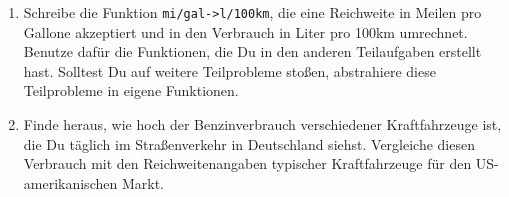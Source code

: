 \begin{aufgabe}
\begin{enumerate}
  \item Schreibe die Funktion
    \texttt{mi/gal->l/100km}, die eine Reichweite in Meilen pro
    Gallone akzeptiert und in den Verbrauch in Liter pro 100km
    umrechnet.  Benutze dafür die Funktionen, die Du in den
    anderen Teilaufgaben erstellt hast.  Solltest Du auf weitere
    Teilprobleme stoßen, abstrahiere diese Teilprobleme in eigene
    Funktionen.

  \item Finde heraus, wie hoch der Benzinverbrauch
    verschiedener Kraftfahrzeuge ist, die Du täglich im
    Straßenverkehr in Deutschland siehst.  Vergleiche diesen
    Verbrauch mit den Reichweitenangaben typischer Kraftfahrzeuge für
    den US-amerikanischen Markt.
  \end{enumerate}

\end{aufgabe}




